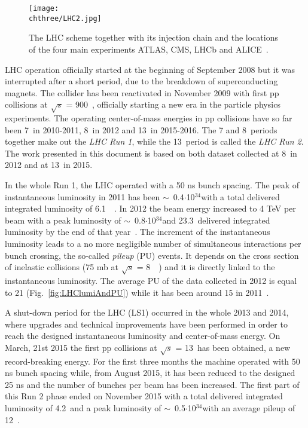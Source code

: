 \begin{figure}[h]
 \begin{center}
  \texttt{[image: \\chthree/LHC2.jpg]}
 \end{center}
 \caption{\small The LHC scheme together with its injection chain and the locations of the four main experiments ATLAS, CMS, LHCb and ALICE~\cite{Marcastel:1621583}.}
 \label{fig:LHC}
\end{figure}

LHC operation officially started at the beginning of September 2008 but it was interrupted after a short period, 
due to the breakdown of superconducting magnets. The collider has been reactivated in November 2009 with first pp collisions at $\sqrt{s}$ = 900~\GeV, officially starting a new era in the particle physics experiments. %
The operating center-of-mass energies in pp collisions have so far been 7~\TeV in 2010-2011, 8~\TeV in 2012 and 13~\TeV in 2015-2016. The 7 and 8~\TeV periods together make out the {\itshape LHC Run 1}, while the 13~\TeV period is called the {\itshape LHC Run 2}. The work presented in this document is based on both dataset collected at 8~\TeV in 2012 and at 13~\TeV in 2015.

In the whole Run 1, the LHC operated with a 50 ns bunch spacing.
The peak of instantaneous luminosity in 2011 has been $\sim$~0.4$\cdot$10$^{34}$\percms with a total delivered integrated luminosity of 6.1~\fbinv~\cite{LumiPublicResults}.
In 2012 the beam energy increased to 4 TeV per beam with a peak luminosity of $\sim$~0.8$\cdot$10$^{34}$\percms and 23.3~\fbinv delivered integrated luminosity by the end of that year~\cite{LumiPublicResults}. The increment of the instantaneous luminosity leads to a no more negligible number of simultaneous interactions per bunch crossing, the so-called {\itshape pileup} (PU) events. It depends on the cross section of inelastic collisions (75 mb at $\sqrt{s}$ = 8~\TeV~\cite{Cartiglia:2013vsa}) and it is directly linked to the instantaneous luminosity. The average PU of the data collected in 2012 is equal to 21 (Fig.~\ref{fig:LHClumiAndPU}) while it has been around 15 in 2011~\cite{LumiPublicResults}.

A shut-down period for the LHC (LS1) occurred in the whole 2013 and 2014, where upgrades and technical improvements have been performed in order to reach the designed instantaneous luminosity and center-of-mass energy. On March, 21st 2015 the first pp collisions at $\sqrt{s}$ = 13~\TeV has been obtained, a new record-breaking energy. For the first three months the machine operated with 50 ns bunch spacing while, from August 2015, it has been reduced to the designed 25 ns and the number of bunches per beam has been increased. The first part of this Run 2 phase ended on November 2015 with a total delivered integrated luminosity of 4.2~\fbinv and a peak luminosity of $\sim$~0.5$\cdot$10$^{34}$\percms with an average pileup of 12~\cite{LumiPublicResults}.

